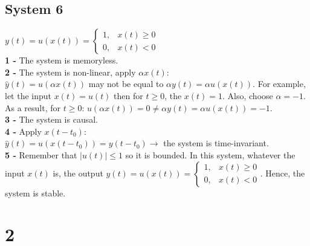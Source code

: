 \documentclass[12pt]{article}
\begin{document}
    \subsection*{System 6}
    \(y(t) = u(x(t)) = \begin{cases}
      1,& x(t) \geq 0\\
      0,& x(t) < 0
    \end{cases} \)\\
    \textbf{1 - }The system is memoryless. \\
    \textbf{2 - }The system is non-linear, apply \(\alpha x(t)\): \\
    \(\hat{y}(t) = u(\alpha x(t))\) may not be equal to \(\alpha y(t) = \alpha u(x(t))\). 
    For example, let the input \(x(t) = u(t)\) then for \(t \geq 0 \), the \(x(t) = 1\).
    Also, choose \(\alpha = -1\). As a result, for \(t \geq 0 \): \(u(\alpha x(t)) = 0 \neq \alpha y(t) = \alpha u(x(t)) = -1\).\\ 
    \textbf{3 - }The system is causal. \\
    \textbf{4 - }Apply \(x(t-t_0)\):\\
    \(\hat{y}(t) = u(x(t-t_0)) = y(t-t_0) \longrightarrow\) the system is time-invariant.\\
    \textbf{5 - }Remember that \(\left\lvert u(t)\right\rvert  \leq 1\) so it is bounded. In this system, whatever the input \(x(t)\)  is, the output 
    \(y(t) = u(x(t)) = \begin{cases}
      1,& x(t) \geq 0\\
      0,& x(t) < 0
    \end{cases}\). Hence, the system is stable. \\ 
 
    \section*{2}
\end{document}
